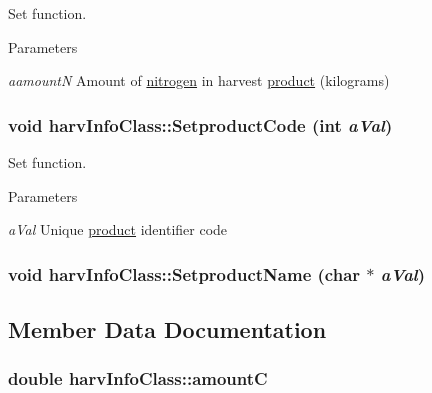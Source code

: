 Set function. 
\begin{DoxyParams}{Parameters}
\item[{\em aamountN}]Amount of \hyperlink{classnitrogen}{nitrogen} in harvest \hyperlink{classproduct}{product} (kilograms) \end{DoxyParams}
\hypertarget{classharv_info_class_a78841976fa02ba16ccc17165cced32fb}{
\subsubsection[{SetproductCode}]{\setlength{\rightskip}{0pt plus 5cm}void harvInfoClass::SetproductCode (int {\em aVal})}}
\label{classharv_info_class_a78841976fa02ba16ccc17165cced32fb}


Set function. 
\begin{DoxyParams}{Parameters}
\item[{\em aVal}]Unique \hyperlink{classproduct}{product} identifier code \end{DoxyParams}
\hypertarget{classharv_info_class_ad65bdedd15fb72b42bd8e0f90c72305a}{
\subsubsection[{SetproductName}]{\setlength{\rightskip}{0pt plus 5cm}void harvInfoClass::SetproductName (char $\ast$ {\em aVal})}}
\label{classharv_info_class_ad65bdedd15fb72b42bd8e0f90c72305a}


\subsection{Member Data Documentation}
\hypertarget{classharv_info_class_ab248e1eae011902fddc10ee1645f1a75}{
\subsubsection[{amountC}]{\setlength{\rightskip}{0pt plus 5cm}double {\bf harvInfoClass::amountC}}}
\label{classharv_info_class_ab248e1eae011902fddc10ee1645f1a75}


